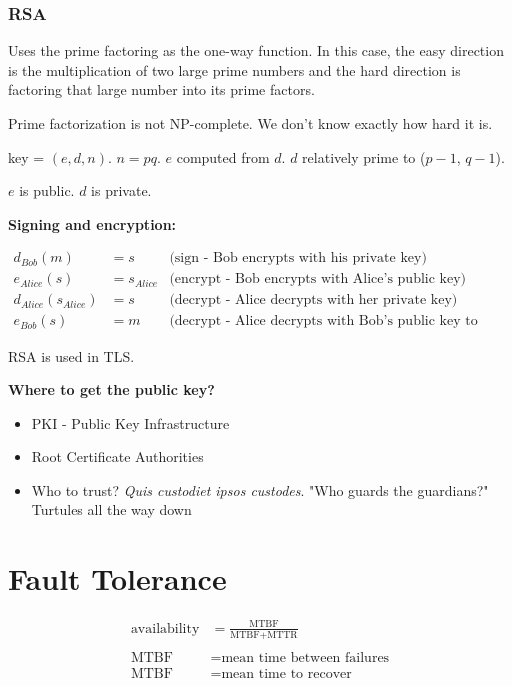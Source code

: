 \documentclass[twoside]{article}
\begin{document}
\subsubsection{RSA}
Uses the prime factoring as the one-way function. In this case, the easy direction is the multiplication of two large prime numbers and the hard direction is factoring that large number into its prime factors.

Prime factorization is not NP-complete. We don't know exactly how hard it is.

key = $(e, d, n)$. $n=pq$. $e$ computed from $d$. $d$ relatively prime to ($p-1$, $q-1$).

$e$ is public. $d$ is private.

\textbf{Signing and encryption:}

\begin{align}
    d_{Bob}(m) &= s & \text{(sign - Bob encrypts with his private key)}\\
    e_{Alice}(s) &= s_{Alice} & \text{(encrypt - Bob encrypts with Alice's public key)}\\
    d_{Alice}(s_{Alice}) &= s & \text{(decrypt - Alice decrypts with her private key)}\\
    e_{Bob}(s) &= m & \text{(decrypt - Alice decrypts with Bob's public key to obtain the message)}
\end{align}

RSA is used in TLS.

\textbf{Where to get the public key?}
\begin{itemize}
    \item PKI - Public Key Infrastructure
    \item Root Certificate Authorities
    \item Who to trust? \textit{Quis custodiet ipsos custodes}. "Who guards the guardians?" Turtules all the way down
\end{itemize}

\section{Fault Tolerance}

\begin{align}
    \text{availability} &= \frac{\text{MTBF}}{\text{MTBF}+\text{MTTR}}\\\\
    \text{MTBF} &= \text{mean time between failures}\\
    \text{MTBF} &= \text{mean time to recover}
\end{align}
\end{document}
